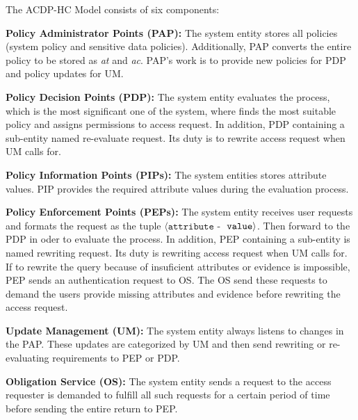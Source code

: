 The ACDP-HC Model consists of six components:

\textbf{Policy Administrator Points (PAP): }The system entity stores all policies (system policy and sensitive data policies). 
Additionally, PAP converts the entire policy to be stored as \textit{at} and \textit{ac}. 
PAP's work is to provide new policies for PDP and policy updates for UM.

\textbf{Policy Decision Points (PDP): }The system entity evaluates the process, which is the most significant one of the system, where finds the most suitable policy and assigns permissions to access request. 
In addition, PDP containing a sub-entity named re-evaluate request. 
Its duty is to rewrite access request when UM calls for.

\textbf{Policy Information Points (PIPs): }The system entities stores attribute values. 
PIP provides the required attribute values during the evaluation process.

\textbf{Policy Enforcement Points (PEPs): }The system entity receives user requests and formats the request as the tuple $\langle \texttt{attribute - }$ $\texttt{va\\lue} \rangle$.
Then forward to the PDP in oder to evaluate the process. 
In addition, PEP containing a sub-entity is named rewriting request. 
Its duty is rewriting access request when UM calls for. 
If to rewrite the query because of insuficient attributes or evidence is impossible, PEP sends an authentication request to OS.
The OS send these requests to demand the users provide missing attributes and evidence before rewriting the access request.

\textbf{Update Management (UM): }The system entity always listens to changes in the PAP. 
These updates are categorized by UM and then send rewriting or re-evaluating requirements to PEP or PDP.

\textbf{Obligation Service (OS): }The system entity sends a request to the access requester is demanded to fulfill all such requests for a certain period of time before sending the entire return to PEP.


